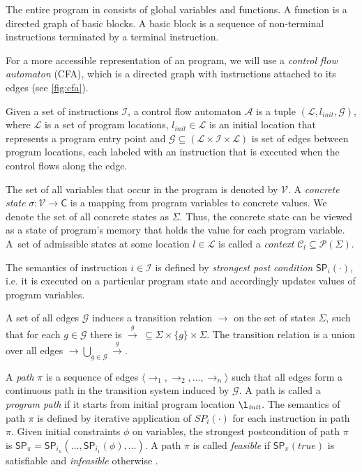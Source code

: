 The entire program in \llvm consists of global variables and functions.  A
function is a directed graph of basic blocks. A basic block is a sequence of
non-terminal instructions terminated by a terminal instruction.

For a more accessible representation of an \llvm program, we will use a
\emph{control flow automaton} (CFA), which is a directed graph with \llvm
instructions attached to its edges (see \autoref{fig:cfa}).

\begin{definition}
    Given a set of instructions $\mathcal{I}$, a control flow automaton
    $\mathcal{A}$ is a tuple $(\mathcal{L}, l_{\textit{init}}, \mathcal{G})$,
    where $\mathcal{L}$ is a set of program locations, $l_{\textit{init}} \in
    \mathcal{L}$ is an initial location that represents a program entry point
    and $\mathcal{G} \subseteq (\mathcal{L} \times \mathcal{I} \times
    \mathcal{L})$ is set of edges between program locations, each labeled with
    an instruction that is executed when the control flows along the edge.
\end{definition}

The set of all variables that occur in the \llvm program is denoted by
$\mathcal{V}$. A \emph{concrete state} $\sigma : \mathcal{V} \rightarrow
\mathsf{C}$ is a mapping from program variables to concrete values. We denote
the set of all concrete states as $\Sigma$. Thus, the concrete state can be
viewed as a state of program's memory that holds the value for each program
variable. A~set of admissible states at some location $l \in \mathcal{L}$ is
called a \emph{context} $\mathcal{C}_l \subseteq \mathcal{P}(\Sigma)$.

The semantics of instruction $i \in \mathcal{I}$ is defined by \emph{strongest
post condition} $\textsf{SP}_{i}(\cdot)$, i.e. it is executed on a particular program
state and accordingly updates values of program variables.

A set of all edges $\mathcal{G}$ induces a transition relation $\rightarrow$ on
the set of states $\Sigma$, such that for each $g \in \mathcal{G}$ there is
$\xrightarrow{g} \: \subseteq \Sigma \times \{g\} \times \Sigma$. The
transition relation is a union over all edges $\rightarrow \bigcup_{g
\in\mathcal{G}} \xrightarrow{g}$.

A \emph{path} $\pi$ is a sequence of edges $\langle
\rightarrow_1, \rightarrow_2, \dots, \rightarrow_n \rangle$ such that all edges
form a continuous path in the transition system induced by $\mathcal{G}$.  A path
is called a \emph{program path} if it starts from initial program location
$\l_{\textit{init}}$. The semantics of path $\pi$ is defined by iterative
application of $SP_{i}( \cdot )$ for each instruction in path $\pi$. Given
initial constraints $\phi$ on variables, the strongest postcondition of path
$\pi$ is $\textsf{SP}_{\pi} = \textsf{SP}_{i_n}(\dots,\textsf{SP}_{i_1}(\phi),\dots)$. A
path $\pi$ is called \emph{feasible} if $\textsf{SP}_{\pi}(\textit{true})$ is
satisfiable and \emph{infeasible} otherwise \cite{Beyer2018b}.

